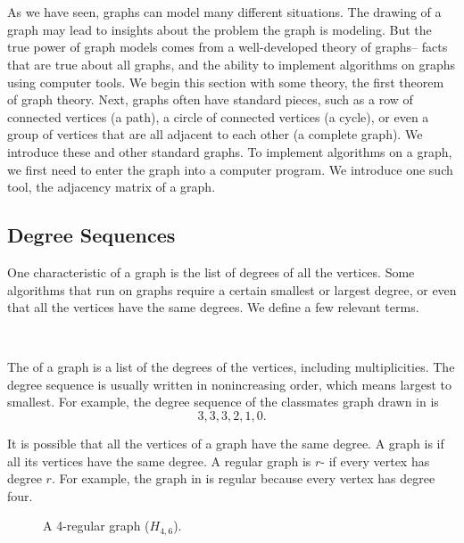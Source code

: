 \section{\secstdgraphs}
\label{sec_std_graphs}

As we have seen, graphs can model many different situations. The drawing of a graph may lead to insights about the problem the graph is modeling.  But the true power of graph models comes from a well-developed theory of graphs-- facts that are true about all graphs, and the ability to implement algorithms on graphs using computer tools.  We begin this section with some theory, the first theorem of graph theory. Next, graphs often have standard pieces, such as a row of connected vertices (a path), a circle of connected vertices (a cycle), or even a group of vertices that are all adjacent to each other (a complete graph).  We introduce these and other standard graphs.  To implement algorithms on a graph, we first need to enter the graph into a computer program. We introduce one such tool, the adjacency matrix of a graph. 


\newcommand{\subdegseq}{Degree Sequences}
\subsection{\subdegseq}
\label{sub_degree_seq}

One characteristic of a graph is the list of degrees of all the vertices.  Some algorithms that run on graphs require a certain smallest or largest degree, or even that all the vertices have the same degrees.  We define a few relevant terms.

\begin{defn}
\label{defn_ds_regular} 
~
    \begin{apart}
        \item The  of a graph is a list of the degrees of the vertices, including multiplicities.  The degree sequence is usually written in nonincreasing order, which means largest to smallest. For example, the degree sequence of the classmates graph drawn in  is 
            $$3, 3, 3, 2, 1, 0.$$

        \item It is possible that all the vertices of a graph have the same degree.  A graph is  if all its vertices have the same degree.  A regular graph is $r$- if every vertex has degree $r$.  For example, the graph in  is regular because every vertex has degree four.  
    \end{apart}

        \begin{figure}[hbtp]
            \centering
            
            \caption{A 4-regular graph ($H_{4,6}$).}
            \label{fig_4reg}
        \end{figure}
\end{defn}

